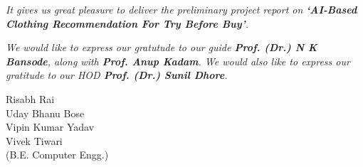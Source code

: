 
\textit{It gives us great pleasure to deliver the preliminary project report on \textbf{`AI-Based Clothing Recommendation For Try Before Buy'}.}

\textit{We would like to express our gratutude to our guide \textbf{Prof. (Dr.) N K Bansode}, along with \textbf{Prof. Anup Kadam}. We would also like to express our gratitude to our HOD \textbf{Prof. (Dr.) Sunil Dhore}.}

\vspace*{\baselineskip}

\begin{flushright}
	Risabh Rai \\
	Uday Bhanu Bose \\
	Vipin Kumar Yadav \\
	Vivek Tiwari \\
	\vspace*{0.5 \baselineskip}
	(B.E. Computer Engg.)
\end{flushright}